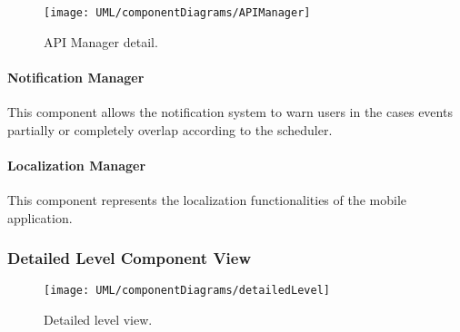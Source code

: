 		\begin{figure}[H]
			\centering
			\texttt{[image: UML/componentDiagrams/APIManager]}
			\caption{API Manager detail.}
			\label{APIManagerDetail}
		\end{figure}
	
	
	\paragraph{Notification Manager}
		This component allows the notification system to warn users in the cases events partially or completely overlap according to the scheduler.

	\paragraph{Localization Manager}
		This component represents the localization functionalities of the mobile application.


\subsubsection{Detailed Level Component View}

	\begin{landscape}
		\begin{figure}
			\texttt{[image: UML/componentDiagrams/detailedLevel]}
			\centering
			\caption{Detailed level view.}
			\label{detailedHighLevel}
		\end{figure}
	\end{landscape}